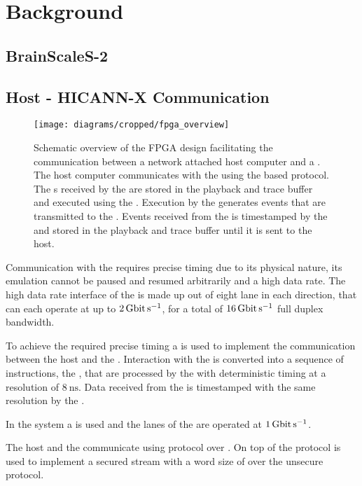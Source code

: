 \section{Background}
\subsection{BrainScaleS-2}
\subsection{Host - HICANN-X Communication}

\begin{figure}
\centerline{\texttt{[image: diagrams/cropped/fpga\_overview]}}
\caption{Schematic overview of the FPGA design facilitating the communication between a network attached host computer and a \HICANNX{} \ASIC{}. The host computer communicates with the \FPGA{} using the \UDP{} based \HostARQ{} protocol. The \PlaybackProgram{}s received by the \FPGA{} are stored in the playback and trace buffer and executed using the \pbexec{}. Execution by the \pbexec{} generates events that are transmitted to the \ASIC{}. Events received from the \ASIC{} is timestamped by the \pbexec{} and stored in the playback and trace buffer until it is sent to the host.}
\end{figure}

Communication with the \ASIC{} requires precise timing due to its physical nature, its emulation cannot be paused and resumed arbitrarily and a high data rate.
The high data rate interface of the \ASIC{} is made up out of eight \LVDS{} lane in each direction, that can each operate at up to $\SI{2}{\giga\bit\per\second}$, for a total of $\SI{16}{\giga\bit\per\second}$ full duplex bandwidth.

To achieve the required precise timing a \FPGA{} is used to implement the communication between the host and the \ASIC{}.
Interaction with the \ASIC{} is converted into a sequence of instructions, the \PlaybackProgram{}, that are processed by the \FPGA{} with deterministic timing at a resolution of $\SI{8}{\nano\second}$.
Data received from the \ASIC{} is timestamped with the same resolution by the \FPGA{}.

In the \BSSTwo{} system a \Xilinx{}  \FPGA{} is used and the \LVDS{} lanes of the \ASIC{} are operated at $\SI{1}{\giga\bit\per\second}$.

The host and the \FPGA{} communicate using \UDP{} protocol over \Gigabitethernet{}. On top of \UDP{} the \HostARQ{}\autocite{ref:hostarq} protocol is used to implement a secured stream with a word size of \PhyWordSize{} over the unsecure \UDP{} protocol.

